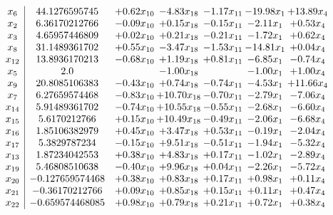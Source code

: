 \documentclass[8pt]{article}
\begin{document}
\[\begin{array}{c| c c@{\hskip 2pt} c@{\hskip 2pt} c@{\hskip 2pt} c@{\hskip 2pt} c@{\hskip 2pt} }
 x_{6}   &  44.1276595745 & +  0.62 x_{10} & -4.83 x_{18} & -1.17 x_{11} & -19.98 x_{1} & + 13.89 x_{4}\\
 x_{2}   &  6.36170212766 & -0.09 x_{10} & +  0.15 x_{18} & -0.15 x_{11} & -2.11 x_{1} & +  0.53 x_{4}\\
 x_{3}   &  4.65957446809 & +  0.02 x_{10} & +  0.21 x_{18} & -0.21 x_{11} & -1.72 x_{1} & +  0.62 x_{4}\\
 x_{8}   &  31.1489361702 & +  0.55 x_{10} & -3.47 x_{18} & -1.53 x_{11} & -14.81 x_{1} & +  0.04 x_{4}\\
 x_{12}   &  13.8936170213 & -0.68 x_{10} & +  1.19 x_{18} & +  0.81 x_{11} & -6.85 x_{1} & -0.74 x_{4}\\
 x_{5}   &  2.0  &   & -1.00 x_{18} &   & -1.00 x_{1} & +  1.00 x_{4}\\
 x_{9}   &  20.8085106383 & -0.43 x_{10} & +  0.74 x_{18} & -0.74 x_{11} & -4.53 x_{1} & + 11.66 x_{4}\\
 x_{7}   &  6.27659574468 & -0.83 x_{10} & + 10.70 x_{18} & -0.70 x_{11} & -2.79 x_{1} & -7.06 x_{4}\\
 x_{14}   &  5.91489361702 & -0.74 x_{10} & + 10.55 x_{18} & -0.55 x_{11} & -2.68 x_{1} & -6.60 x_{4}\\
 x_{15}   &  5.6170212766 & +  0.15 x_{10} & + 10.49 x_{18} & -0.49 x_{11} & -2.06 x_{1} & -6.68 x_{4}\\
 x_{16}   &  1.85106382979 & +  0.45 x_{10} & +  3.47 x_{18} & +  0.53 x_{11} & -0.19 x_{1} & -2.04 x_{4}\\
 x_{17}   &  5.3829787234 & -0.15 x_{10} & +  9.51 x_{18} & -0.51 x_{11} & -1.94 x_{1} & -5.32 x_{4}\\
 x_{13}   &  1.87234042553 & +  0.38 x_{10} & +  4.83 x_{18} & +  0.17 x_{11} & -1.02 x_{1} & -2.89 x_{4}\\
 x_{19}   &  5.46808510638 & -0.40 x_{10} & +  9.96 x_{18} & +  0.04 x_{11} & -2.26 x_{1} & -5.72 x_{4}\\
 x_{20}   &  -0.127659574468 & +  0.38 x_{10} & +  0.83 x_{18} & +  0.17 x_{11} & +  0.98 x_{1} & +  0.11 x_{4}\\
 x_{21}   &  -0.36170212766 & +  0.09 x_{10} & +  0.85 x_{18} & +  0.15 x_{11} & +  0.11 x_{1} & +  0.47 x_{4}\\
 x_{22}   &  -0.659574468085 & +  0.98 x_{10} & +  0.79 x_{18} & +  0.21 x_{11} & +  0.72 x_{1} & +  0.38 x_{4}\\

\end{array}\]
\end{document}
